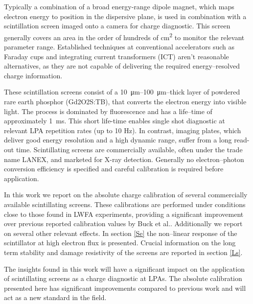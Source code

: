 \documentclass[%
reprint,
amsmath,
amssymb,
aip,
rsi, 
numerical,
floatfix,
]{revtex4-1}
\newcommand{\myCite}[1]{\textcolor{blue}{\cite{#1}}}
\begin{document}
Typically a combination of a broad energy-range dipole magnet, which maps electron energy to position in the dispersive plane, is used in combination with a scintillation screen imaged onto a camera for charge diagnostic. 
This screen generally covers an area in the order of hundreds of \si{\centi\metre^2} to monitor the relevant parameter range. 
Established techniques at conventional accelerators such as Faraday cups and integrating current transformers (ICT) aren't reasonable alternatives, as they are not capable of delivering the required energy--resolved charge information.

These scintillation screens consist of a \SIrange{10}{100}{\micro\meter}--thick layer of powdered rare earth phosphor (Gd2O2S:TB), that converts the electron energy into visible light. 
The process is dominated by fluorescence and has a life--time of approximately \SI{1}{\milli\second}. 
This short life-time enables single shot diagnostic at relevant LPA repetition rates (up to 10 Hz). 
In contrast, imaging plates, which deliver good energy resolution and a high dynamic range\myCite{Tanaka2005,Masuda2008,Zeil2010,Bonnet2013}, suffer from a long read-out time.
Scintillating screens are commercially available, often under the trade name LANEX, and marketed for X-ray detection. 
Generally no electron--photon conversion efficiency is specified and careful calibration is required before application.

In this work we report on the absolute charge calibration of several commercially available scintillating screens. 
These calibrations are performed under conditions close to those found in LWFA experiments, providing a significant improvement over previous reported calibration values by Buck et al.\myCite{Buck2010}.
Additionally we report on several other relevant effects. 
In section \ref{Se} the non--linear response of the scintillator at high electron flux is presented. 
Crucial information on the long term stability and damage resistivity of the screens are reported in section \ref{Ls}.

The insights found in this work will have a significant impact on the application of scintillating screens as a charge diagnostic at LPAs. 
The absolute calibration presented here has significant improvements compared to previous work and  will act as a new standard in the field.  
\end{document}
